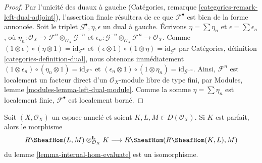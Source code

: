 \begin{proof}

Par l'unicité des duaux à gauche (Catégories, remarque \ref{categories-remark-left-dual-adjoint}), l'assertion finale résultera de ce que $\mathcal{F}^\bullet$
est bien de la forme annoncée. Soit le triplet $\mathcal{G}^\bullet, \eta, \epsilon$ un dual à gauche. Écrivons $\eta = \sum \eta_n$ et $\epsilon = \sum \epsilon_n$,
où $\eta_n : \mathcal{O}_X \to
\mathcal{F}^n \otimes_{\mathcal{O}_X} \mathcal{G}^{-n}$
et
$\epsilon_n : \mathcal{G}^{-n} \otimes_{\mathcal{O}_X} \mathcal{F}^n
\to \mathcal{O}_X$. Comme
$(1 \otimes \epsilon) \circ (\eta \otimes 1) = \text{id}_{\mathcal{F}^\bullet}$
et
$(\epsilon \otimes 1) \circ (1 \otimes \eta) = \text{id}_{\mathcal{G}^\bullet}$
par Catégories, définition \ref{categories-definition-dual}, nous obtenons immédiatement
$(1 \otimes \epsilon_n) \circ (\eta_n \otimes 1) = \text{id}_{\mathcal{F}^n}$
et
$(\epsilon_n \otimes 1) \circ (1 \otimes \eta_n) =
\text{id}_{\mathcal{G}^{-n}}$. Ainsi, $\mathcal{F}^n$ est localement un facteur direct d'un $\mathcal{O}_X$-module libre de type fini, par Modules, lemme \ref{modules-lemma-left-dual-module}. Comme la somme $\eta = \sum \eta_n$ est localement finie,
$\mathcal{F}^\bullet$ est localement borné.

\end{proof}

\begin{lemma}

\label{lemma-internal-hom-evaluate-isom}
Soit $(X, \mathcal{O}_X)$ un espace annelé et soient $K, L, M \in D(\mathcal{O}_X)$. Si $K$ est parfait, alors le morphisme $$
R\SheafHom(L, M) \otimes_{\mathcal{O}_X}^\mathbf{L} K
\longrightarrow
R\SheafHom(R\SheafHom(K, L), M)
$$ du lemme \ref{lemma-internal-hom-evaluate} est un isomorphisme.
\end{lemma}

